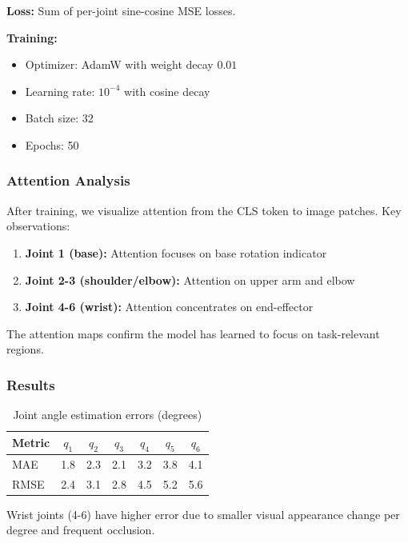 \textbf{Loss:} Sum of per-joint sine-cosine MSE losses.

\textbf{Training:}
\begin{itemize}
    \item Optimizer: AdamW with weight decay $0.01$
    \item Learning rate: $10^{-4}$ with cosine decay
    \item Batch size: 32
    \item Epochs: 50
\end{itemize}

\subsubsection{Attention Analysis}

After training, we visualize attention from the CLS token to image patches. Key observations:

\begin{enumerate}
    \item \textbf{Joint 1 (base):} Attention focuses on base rotation indicator
    \item \textbf{Joint 2-3 (shoulder/elbow):} Attention on upper arm and elbow
    \item \textbf{Joint 4-6 (wrist):} Attention concentrates on end-effector
\end{enumerate}

The attention maps confirm the model has learned to focus on task-relevant regions.

\subsubsection{Results}

\begin{table}[htbp]
\centering
\caption{Joint angle estimation errors (degrees)}
\label{tab:robot_arm_results}
\begin{tabular}{lcccccc}
\toprule
\textbf{Metric} & \textbf{$q_1$} & \textbf{$q_2$} & \textbf{$q_3$} & \textbf{$q_4$} & \textbf{$q_5$} & \textbf{$q_6$} \\
\midrule
MAE & 1.8 & 2.3 & 2.1 & 3.2 & 3.8 & 4.1 \\
RMSE & 2.4 & 3.1 & 2.8 & 4.5 & 5.2 & 5.6 \\
\bottomrule
\end{tabular}
\end{table}

Wrist joints (4-6) have higher error due to smaller visual appearance change per degree and frequent occlusion.


